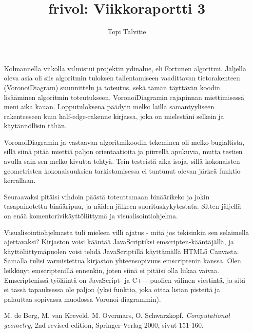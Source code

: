 \documentclass[a4paper, 11pt, finnish]{article}
\author{Topi Talvitie}
\title{frivol: Viikkoraportti 3}
\begin{document}
\maketitle

Kolmannella viikolla valmistui projektin ydinalue, eli Fortunen algoritmi. Jäljellä oleva asia oli siis algoritmin tuloksen tallentamiseen vaadittavan tietorakenteen (VoronoiDiagram) suunnittelu ja toteutus, sekä tämän täyttävän koodin lisääminen algoritmin toteutukseen. VoronoiDiagramin rajapinnan miettimisessä meni aika kauan. Lopputuloksena päädyin melko lailla samantyyliseen rakenteeseen kuin half-edge-rakenne kirjassa\cite{compgeomkirja}, joka on mielestäni selkein ja käytännöllisin tähän.

VoronoiDiagramin ja vastaavan algoritmikoodin tekeminen oli melko bugialtista, sillä siinä pitää miettiä paljon orientaatioita ja piirrellä apukuvia, mutta testien avulla sain sen melko kivutta tehtyä. Tein testeistä aika isoja, sillä kokonaisten geometristen kokonaisuuksien tarkistamisessa ei tuntunut olevan järkeä funktio kerrallaan.

Seuraavaksi pitäisi vihdoin päästä toteuttamaan binäärikeko ja jokin tasapainotettu binääripuu, ja näiden jälkeen suorituskykytestata. Sitten jäljellä on enää komentorivikäyttöliittymä ja visualisointiohjelma. 

Visualisointiohjelmasta tuli mieleen villi ajatus - mitä jos tekisinkin sen selaimella ajettavaksi? Kirjaston voisi kääntää JavaScriptiksi emscripten-kääntäjällä, ja käyttöliittymäpuolen voisi tehdä JavaScriptillä käyttämällä HTML5 Canvasta. Samalla tulisi varmistettua kirjaston yhteensopivuus emscriptenin kanssa. Olen leikkinyt emscriptenillä ennenkin, joten siinä ei pitäisi olla liikaa vaivaa. Emscriptenissä työläintä on JavaScript- ja C++-puolien välinen viestintä, ja sitä ei tässä tapauksessa ole paljon (yksi funktio, joka ottaa listan pisteitä ja palauttaa sopivassa muodossa Voronoi-diagrammin).

\begin{thebibliography}{9}
 M. de Berg, M. van Kreveld, M. Overmars, O. Schwarzkopf, \emph{Computational geometry}, 2nd revised edition, Springer-Verlag 2000, sivut 151-160.
\end{thebibliography}
\end{document}
